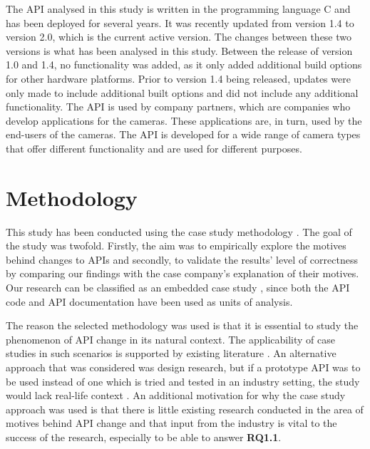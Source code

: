 \documentclass{sig-alternate}
\begin{document}
The API analysed in this study is written in the programming language C and has been deployed for several years. It was recently updated from version 1.4 to version 2.0, which is the current active version. The changes between these two versions is what has been analysed in this study. Between the release of version 1.0 and 1.4, no functionality was added, as it only added additional build options for other hardware platforms. Prior to version 1.4 being released, updates were only made to include additional built options and did not include any additional functionality. The API is used by company partners, which are companies who develop applications for the cameras. These applications are, in turn, used by the end-users of the cameras. The API is developed for a wide range of camera types that offer different functionality and are used for different purposes. 




\section{Methodology} \label{methodology}
This study has been conducted using the case study methodology \cite{runeson2009guidelines}. The goal of the study was twofold. Firstly, the aim was to empirically explore the motives behind changes to APIs and secondly, to validate the results' level of correctness by comparing our findings with the case company's explanation of their motives. Our research can be classified as an embedded case study \cite{yin2013case}, since both the API code and API documentation have been used as units of analysis. 

The reason the selected methodology was used is that it is essential to study the phenomenon of API change in its natural context. The applicability of case studies in such scenarios is supported by existing literature \cite{benbasat1987case} \cite{runeson2009guidelines} \cite{yin2013case} \cite{robson2002real}. An alternative approach that was considered was design research, but if a prototype API was to be used instead of one which is tried and tested in an industry setting, the study would lack real-life context \cite{runeson2009guidelines}. An additional motivation for why the case study approach was used is that there is little existing research conducted in the area of motives behind API change and that input from the industry is vital to the success of the research, especially to be able to answer \textbf{RQ1.1}. 
\end{document}
